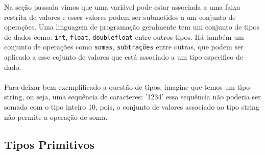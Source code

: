 \documentclass[12pt, onecolumn]{article}
\begin{document}
	Na seção passada vimos que uma variável pode estar associada a uma 
	faixa restrita de valores e esses valores podem ser submetidos a um
	conjunto de operações. Uma linguagem de programação geralmente tem 
	um conjunto de tipos de dados como: \texttt{int}, \texttt{float},
	\texttt{doublefloat} entre outros tipos. Há também um conjunto de 
	operações como \texttt{somas}, \texttt{subtrações} entre outras,
	que podem ser aplicado a esse cojunto de valores que está associado
	a um tipo especifico de dado.\\
	\\
	Para deixar bem exemplificado a questão de tipos, imagine que temos 
	um tipo string, ou seja, uma sequência de caracteres: '1234' essa 
	sequência não poderia ser somada com o tipo inteiro 10, pois, o conjunto
	de valores associado ao tipo string não permite a operação de soma.\\
	
		\subsection{Tipos Primitivos}
\end{document}
